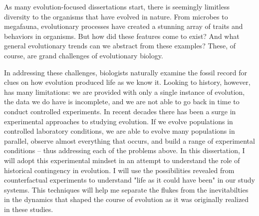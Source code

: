 
As many evolution-focused dissertations start, there is seemingly limitless diversity to the organisms that have evolved in nature. 
From microbes to megafauna, evolutionary processes have created a stunning array of traits and behaviors in organisms. 
But how did these features come to exist?
And what general evolutionary trends can we abstract from these examples? 
These, of course, are grand challenges of evolutionary biology. 

In addressing these challenges, biologists naturally examine the fossil record for clues on how evolution produced life as we know it.
Looking to history, however, has many limitations: we are provided with only a single instance of evolution, the data we do have is incomplete, and we are not able to go back in time to conduct controlled experiments.
In recent decades there has been a surge in experimental approaches to studying evolution.
If we evolve populations in controlled laboratory conditions, we are able to evolve many populations in parallel, observe almost everything that occurs, and build a range of experimental conditions -- thus addressing each of the problems above.
In this dissertation, I will adopt this experimental mindset in an attempt to understand the role of historical contingency in evolution. 
I will use the possibilities revealed from counterfactual experiments to understand "life as it could have been" in our study systems.
This techniques will help me separate the flukes from the inevitabilties in the dynamics that shaped the course of evolution as it was originally realized in these studies.

